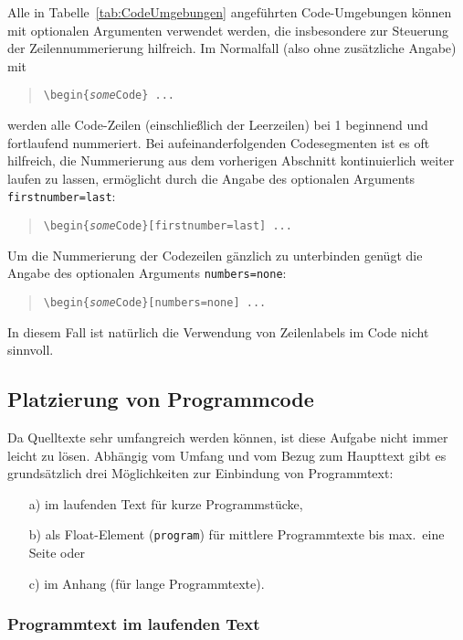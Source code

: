 Alle in Tabelle~\ref{tab:CodeUmgebungen} angeführten Code-Umgebungen können
mit optionalen Argumenten verwendet werden, die insbesondere zur Steuerung der
Zeilennummerierung hilfreich. 
Im Normalfall (also ohne zusätzliche Angabe) mit
%
\begin{quote}
\verb!\begin{!\texttt{\emph{some}Code}\verb!} ... !
\end{quote}
%
werden alle Code-Zeilen (einschließlich der Leerzeilen) bei 1 beginnend und 
fortlaufend nummeriert.
%
Bei aufeinanderfolgenden Codesegmenten ist es oft hilfreich, die Nummerierung 
aus dem vorherigen Abschnitt kontinuierlich weiter laufen zu lassen,
ermöglicht durch die Angabe des optionalen Arguments 
\texttt{firstnumber={\obnh}last}:
%
\begin{quote}
\verb!\begin{!\texttt{\emph{some}Code}\verb!}[firstnumber=last] ... !
\end{quote}
%
Um die Nummerierung der Codezeilen gänzlich zu unterbinden genügt die Angabe
des optionalen Arguments
\texttt{numbers={\obnh}none}:
%
\begin{quote}
\verb!\begin{!\texttt{\emph{some}Code}\verb!}[numbers=none] ... !
\end{quote}
%
In diesem Fall ist natürlich die Verwendung von Zeilenlabels im Code nicht
sinnvoll.


\subsection{Platzierung von Programmcode}

Da Quelltexte sehr umfangreich werden können, ist diese Aufgabe nicht
immer leicht zu lösen. Abhängig vom Umfang und vom Bezug zum Haupttext
gibt es grundsätzlich drei Möglichkeiten zur Einbindung von Programmtext:
%
\begin{itemize}
\item[a)] im laufenden Text für kurze Programmstücke,
\item[b)] als Float-Element (\texttt{program}) für mittlere Programmtexte bis max.\ eine Seite oder
\item[c)] im Anhang (für lange Programmtexte).
\end{itemize}

\subsubsection{Programmtext im laufenden Text}

